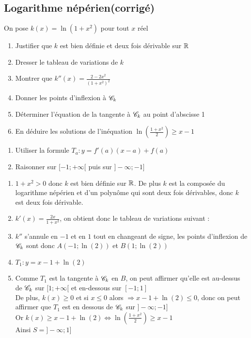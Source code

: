 \documentclass[oneside,12pt]{book}          %
\begin{document}
\subsection{Logarithme népérien\quad\small{(corrigé)}}
On pose $k(x)=\ln(1+x^2)$ pour tout $x$ réel
\begin{enumerate}
    \item Justifier que $k$ est bien définie et deux fois dérivable sur ${\mathbb R}$
    \item Dresser le tableau de variations de $k$
    \item Montrer que $k''(x)=\frac{2-2x^2}{(1+x^2)^2}$
    \item Donner les points d'inflexion à ${\mathscr{C}}_k$
    \item Déterminer l'équation de la tangente à ${\mathscr{C}}_k$ au point d'abscisse 1
    \item En déduire les solutions de l'inéquation $\ln\left(\frac{1+x^2}{2}\right)\geq x-1$
\end{enumerate}

\begin{hint}
	\begin{enumerate}
		\item[5.] Utiliser la formule $T_a:y=f'(a)(x-a)+f(a)$
		\item[6.] Raisonner sur $[-1;+\infty[$ puis sur $]-\infty;-1]$
	\end{enumerate}
\end{hint}
\begin{sol}
	\begin{enumerate}
		\item $1+x^2>0$ donc $k$ est bien définie sur ${\mathbb R}$. De plus $k$ est la composée du logarithme népérien et d'un polynôme qui sont deux fois dérivables, donc $k$ est deux fois dérivable.
		\item $k'(x)=\frac{2x}{1+x^2}$, on obtient donc le tableau de variations suivant :
		
		\item[4.] $k''$ s'annule en $-1$ et en $1$ tout en changeant de signe, les points d'inflexion de ${\mathscr{C}}_k$ sont donc $A(-1;\ln(2))$ et $B(1;\ln(2))$
		\item[5.] $T_1:y=x-1+\ln(2)$
		\item[6.] Comme $T_1$ est la tangente à ${\mathscr{C}}_k$ en $B$, on peut affirmer qu'elle est au-dessus de ${\mathscr{C}}_k$ sur $[1;+\infty[$ et en-dessous sur $[-1;1]$\\
		De plus, $k(x)\geq0$ et si $x\leq0$ alors $\Rightarrow x-1+\ln(2)\leq0$, donc on peut affirmer que $T_1$ est en dessous de ${\mathscr{C}}_k$ sur $]-\infty;-1]$\\
		Or $k(x)\geq x-1+\ln(2) \Leftrightarrow \ln\left(\frac{1+x^2}{2}\right)\geq x-1$\\
		Ainsi $S=]-\infty;1]$
	\end{enumerate}
\end{sol}
\end{document}
